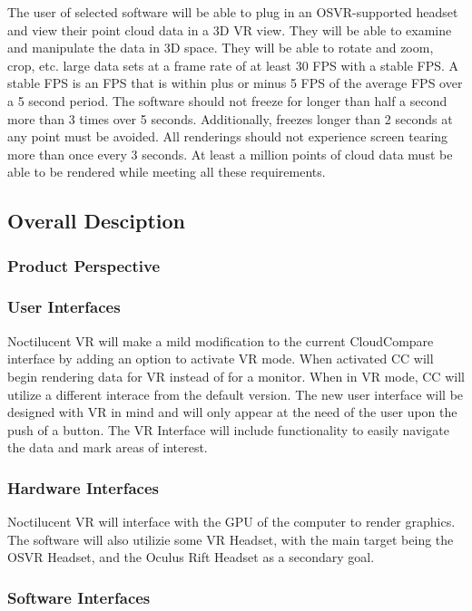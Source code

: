 The user of selected software will be able to plug in an OSVR-supported headset and view their point cloud data in a 3D VR view.
They will be able to examine and manipulate the data in 3D space. 
They will be able to rotate and zoom, crop, etc. large data sets at a frame rate of at least 30 FPS with a stable FPS.
A stable FPS is an FPS that is within plus or minus 5 FPS of the average FPS over a 5 second period.
The software should not freeze for longer than half a second more than 3 times over 5 seconds.
Additionally, freezes longer than 2 seconds at any point must be avoided.
All renderings should not experience screen tearing more than once every 3 seconds.
At least a million points of cloud data must be able to be rendered while meeting all these requirements.

\subsection{Overall Desciption}
\subsubsection{Product Perspective}

\subsubsection{User Interfaces}

Noctilucent VR will make a mild modification to the current CloudCompare interface by adding an option to activate VR mode. 
When activated CC will begin rendering data for VR instead of for a monitor.
When in VR mode, CC will utilize a different interace from the default version.
The new user interface will be designed with VR in mind and will only appear at the need of the user upon the push of a button.
The VR Interface will include functionality to easily navigate the data and mark areas of interest.

\subsubsection{Hardware Interfaces}

Noctilucent VR will interface with the GPU of the computer to render graphics.
The software will also utilizie some VR Headset, with the main target being the
OSVR Headset, and the Oculus Rift Headset as a secondary goal.

\subsubsection{Software Interfaces}


